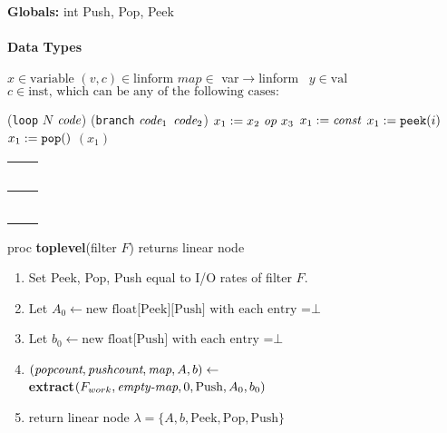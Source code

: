 \clearpage

\newcommand{\maptype}{var$\rightarrow$linform~}
\newcommand{\la}{$\leftarrow$}
\newcommand{\IND}{\begin{ALC@g}}
\newcommand{\UND}{\end{ALC@g}}

\begin{algorithm}
{\bf Globals:} int Push, Pop, Peek \\ ~ \\
%
{\bf Data Types}
\begin{algorithmic}
\STATE $x \in \mbox{variable}$
\STATE $(v, c) \in \mbox{linform}$
\STATE $map \in $ \maptype
\STATE $y \in \mbox{val}$
\STATE $c \in \mbox{inst, which can be any of the following cases:}$
\IND
\STATE ({\tt loop} $N$ $\mbox{\it code}$)
\STATE ({\tt branch} $\mbox{\it code}_1$ $\mbox{\it code}_2$)
\STATE $x_1 := x_2~\mbox{\it op}~x_3$
\STATE $x_1 := \mbox{\it const}$
\STATE $x_1 := \mbox{\tt peek}(i)$
\STATE $x_1 := \mbox{\tt pop}()$
$(x_1)$
\UND
\end{algorithmic}
\begin{tabular}{l}
~\hspace{3in}~ \\
\hline \\
~\hspace{3in}~ 
\end{tabular}
proc {\bf toplevel}(filter $F$) returns linear node
\begin{enumerate}
\item Set Peek, Pop, Push equal to I/O rates of filter $F$.
\item Let $A_{0} \leftarrow \mbox{new float[Peek][Push] with each entry =} \bot$
\item Let $b_{0} \leftarrow \mbox{new float[Push] with each entry =} \bot$
\item $(\mbox{\it popcount}, \mbox{\it pushcount}, \mbox{\it map}, A, b) \leftarrow$ \\
{\bf extract}$(F_{work}, \mbox{\it empty-map}, 0, \mbox{Push}, A_{0}, b_{0})$
\item
\begin{algorithmic}
\STATE return linear node $\lambda = \{A, b, \mbox{Peek}, \mbox{Pop}, \mbox{Push}\}$
\ELSE
{}
\ENDIF
\end{algorithmic}
\end{enumerate}

\end{algorithm}
